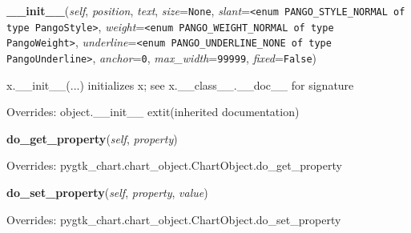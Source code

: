     \vspace{0.5ex}

\hspace{.8\funcindent}\begin{boxedminipage}{\funcwidth}

    \raggedright \textbf{\_\_init\_\_}(\textit{self}, \textit{position}, \textit{text}, \textit{size}={\tt None}, \textit{slant}={\tt {\textless}enum PANGO\_STYLE\_NORMAL of type PangoStyle{\textgreater}}, \textit{weight}={\tt {\textless}enum PANGO\_WEIGHT\_NORMAL of type PangoWeight{\textgreater}}, \textit{underline}={\tt {\textless}enum PANGO\_UNDERLINE\_NONE of type PangoUnderline{\textgreater}}, \textit{anchor}={\tt 0}, \textit{max\_width}={\tt 99999}, \textit{fixed}={\tt False})

\setlength{\parskip}{2ex}
    x.\_\_init\_\_(...) initializes x; see x.\_\_class\_\_.\_\_doc\_\_ for 
    signature

\setlength{\parskip}{1ex}
      Overrides: object.\_\_init\_\_ 	extit{(inherited documentation)}

    \end{boxedminipage}

    \vspace{0.5ex}

\hspace{.8\funcindent}\begin{boxedminipage}{\funcwidth}

    \raggedright \textbf{do\_get\_property}(\textit{self}, \textit{property})

\setlength{\parskip}{2ex}
\setlength{\parskip}{1ex}
      Overrides: pygtk\_chart.chart\_object.ChartObject.do\_get\_property

    \end{boxedminipage}

    \vspace{0.5ex}

\hspace{.8\funcindent}\begin{boxedminipage}{\funcwidth}

    \raggedright \textbf{do\_set\_property}(\textit{self}, \textit{property}, \textit{value})

\setlength{\parskip}{2ex}
\setlength{\parskip}{1ex}
      Overrides: pygtk\_chart.chart\_object.ChartObject.do\_set\_property

    \end{boxedminipage}

    \label{pygtk_chart:label:Label:get_calculated_dimensions}

